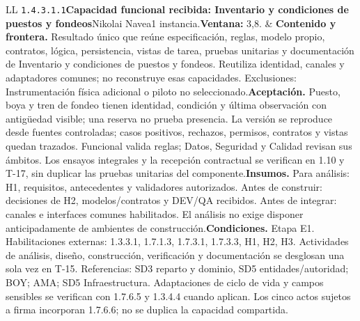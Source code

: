 \begin{longtable}{L{\tabcolsep\relax}L{\tabcolsep\relax}}
\texttt{1.\allowbreak{}4.\allowbreak{}3.\allowbreak{}1.\allowbreak{}1}\newline{}\textbf{Capacidad funcional recibida: Inventario y condiciones de puestos y fondeos}\newline{}Nikolai Navea\newline{}1 instancia.\newline{}\textbf{Ventana:} 3,8. & \textbf{Contenido y frontera.} Resultado único que reúne especificación, reglas, modelo propio, contratos, lógica, persistencia, vistas de tarea, pruebas unitarias y documentación de Inventario y condiciones de puestos y fondeos. Reutiliza identidad, canales y adaptadores comunes; no reconstruye esas capacidades. Exclusiones: Instrumentación física adicional o piloto no seleccionado.\newline{}\textbf{Aceptación.} Puesto, boya y tren de fondeo tienen identidad, condición y última observación con antigüedad visible; una reserva no prueba presencia. La versión se reproduce desde fuentes controladas; casos positivos, rechazos, permisos, contratos y vistas quedan trazados. Funcional valida reglas; Datos, Seguridad y Calidad revisan sus ámbitos. Los ensayos integrales y la recepción contractual se verifican en 1.10 y T-17, sin duplicar las pruebas unitarias del componente.\newline{}\textbf{Insumos.} Para análisis: H1, requisitos, antecedentes y validadores autorizados. Antes de construir: decisiones de H2, modelos/contratos y DEV/QA recibidos. Antes de integrar: canales e interfaces comunes habilitados. El análisis no exige disponer anticipadamente de ambientes de construcción.\newline{}\textbf{Condiciones.} Etapa E1. Habilitaciones externas: 1.3.3.1, 1.7.1.3, 1.7.3.1, 1.7.3.3, H1, H2, H3. Actividades de análisis, diseño, construcción, verificación y documentación se desglosan una sola vez en T-15. Referencias: SD3 reparto y dominio, SD5 entidades/autoridad; BOY; AMA; SD5 Infraestructura. Adaptaciones de ciclo de vida y campos sensibles se verifican con 1.7.6.5 y 1.3.4.4 cuando aplican. Los cinco actos sujetos a firma incorporan 1.7.6.6; no se duplica la capacidad compartida.\\\hline

\end{longtable}
